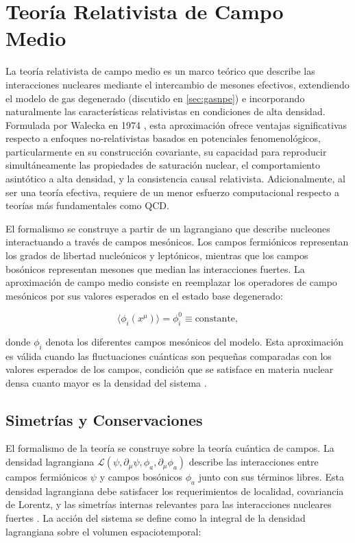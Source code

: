 \section{Teoría Relativista de Campo Medio}
\label{sec:rmft}

La teoría relativista de campo medio es un marco teórico que describe las interacciones nucleares mediante el intercambio de mesones efectivos, extendiendo el modelo de gas degenerado (discutido en \ref{sec:gasnpe}) e incorporando naturalmente las características relativistas en condiciones de alta densidad. Formulada por Walecka en 1974 \cite{waleckaTheoryHighlyCondensed1974}, esta aproximación ofrece ventajas significativas respecto a enfoques no-relativistas basados en potenciales fenomenológicos, particularmente en su construcción covariante, su capacidad para reproducir simultáneamente las propiedades de saturación nuclear, el comportamiento asintótico a alta densidad, y la consistencia causal relativista. Adicionalmente, al ser una teoría efectiva, requiere de un menor esfuerzo computacional respecto a teorías más fundamentales como QCD.

El formalismo se construye a partir de un lagrangiano que describe nucleones interactuando a través de campos mesónicos. Los campos fermiónicos representan los grados de libertad nucleónicos y leptónicos, mientras que los campos bosónicos representan mesones que median las interacciones fuertes. La aproximación de campo medio consiste en reemplazar los operadores de campo mesónicos por sus valores esperados en el estado base degenerado:

\begin{equation}
	\langle \phi_i(x^\mu) \rangle = \phi_i^0 \equiv \text{constante},
	\label{eq:campo_medio}
\end{equation}

donde $\phi_i$ denota los diferentes campos mesónicos del modelo. Esta aproximación es válida cuando las fluctuaciones cuánticas son pequeñas comparadas con los valores esperados de los campos, condición que se satisface en materia nuclear densa cuanto mayor es la densidad del sistema \cite{waleckaRelativisticNuclearManyBody1986}.

\subsection{Simetrías y Conservaciones}

El formalismo de la teoría se construye sobre la teoría cuántica de campos. La densidad lagrangiana $\mathcal{L}(\psi, \partial_\mu \psi, \phi_a, \partial_\mu \phi_a)$ describe las interacciones entre campos fermiónicos $\psi$ y campos bosónicos $\phi_a$ junto con sus términos libres. Esta densidad lagrangiana debe satisfacer los requerimientos de localidad, covariancia de Lorentz, y las simetrías internas relevantes para las interacciones nucleares fuertes \cite{glendenningCompactStarsNuclear2000}. La acción del sistema se define como la integral de la densidad lagrangiana sobre el volumen espaciotemporal:

